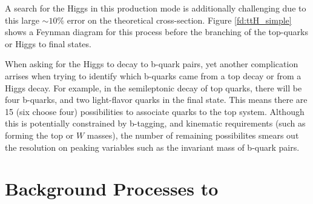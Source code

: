\noindent A search for the Higgs in this production mode is
additionally challenging due to this large $\sim10\%$ error on the
theoretical cross-section.  Figure \ref{fd:ttH_simple} shows a Feynman
diagram for this process before the branching of the top-quarks or
Higgs to final states.  

\par When asking for the Higgs to decay to b-quark
pairs, yet another complication arrises when trying to identify which
b-quarks came from a top decay or from a Higgs decay.  For example, in
the semileptonic decay of top quarks, there will be four b-quarks, and
two light-flavor quarks in the final state.  This means there are 15
(six choose four) possibilities to associate quarks to the top
system.  Although this is potentially constrained by b-tagging, and
kinematic requirements (such as forming the top or $W$ masses), the
number of remaining possibilites smears out the resolution on peaking
variables such as the invariant mass of b-quark pairs.  


\section{Background Processes to \ttH}
\label{ttH_backgrounds_overview}

